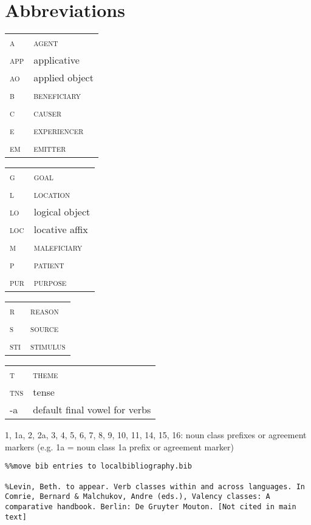 \documentclass[output=paper]{langsci/langscibook}
\begin{document}
\section*{Abbreviations}

\begin{tabularx}{.45\textwidth}{lX}
\textsc{a} & \textsc{agent} \\
\textsc{app} & applicative \\
\textsc{ao} & applied object  \\
\textsc{b} & \textsc{beneficiary} \\
\textsc{c} & \textsc{causer} \\
\textsc{e} & \textsc{experiencer} \\
\textsc{em} & \textsc{emitter} \\
\end{tabularx}
\begin{tabularx}{.45\textwidth}{lX}
\textsc{g} & \textsc{goal} \\
\textsc{l} & \textsc{location} \\
\textsc{lo} & logical object  \\
\textsc{loc} & locative affix \\
\textsc{m} & \textsc{maleficiary} \\
\textsc{p} & \textsc{patient} \\
\textsc{pur} & \textsc{purpose}  \\
\end{tabularx}

\begin{tabularx}{.45\textwidth}{lX}
\textsc{r} & \textsc{reason} \\
\textsc{s} & \textsc{source} \\
\textsc{sti} & \textsc{stimulus} \\
\end{tabularx}
\begin{tabularx}{.45\textwidth}{lX}
\textsc{t} & \textsc{theme} \\
\textsc{tns} & tense  \\
-a & default final vowel for verbs \\
\end{tabularx}

1, 1a, 2, 2a, 3, 4, 5, 6, 7, 8, 9, 10, 11, 14, 15, 16: noun class prefixes or agreement markers (e.g. 1a = noun class 1a prefix or agreement marker)

\begin{verbatim}%%move bib entries to localbibliography.bib

%Levin, Beth. to appear. Verb classes within and across languages. In Comrie, Bernard & Malchukov, Andre (eds.), Valency classes: A comparative handbook. Berlin: De Gruyter Mouton. [Not cited in main text]

\end{verbatim}

\printbibliography[heading=subbibliography,notkeyword=this]
\end{document}
